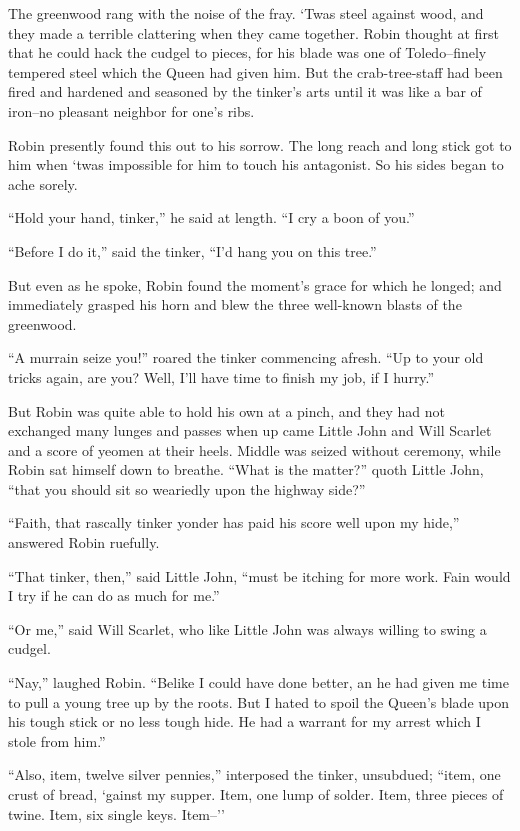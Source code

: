 The greenwood rang with the noise of the fray. `Twas steel against wood,
and they made a terrible clattering when they came together. Robin
thought at first that he could hack the cudgel to pieces, for his blade
was one of Toledo--finely tempered steel which the Queen had given him.
But the crab-tree-staff had been fired and hardened and seasoned by the
tinker's arts until it was like a bar of iron--no pleasant neighbor for
one's ribs.

Robin presently found this out to his sorrow. The long reach and long
stick got to him when `twas impossible for him to touch his antagonist.
So his sides began to ache sorely.

``Hold your hand, tinker,'' he said at length. ``I cry a boon of you.''

``Before I do it,'' said the tinker, ``I'd hang you on this tree.''

But even as he spoke, Robin found the moment's grace for which he
longed; and immediately grasped his horn and blew the three well-known
blasts of the greenwood.

``A murrain seize you!'' roared the tinker commencing afresh. ``Up to
your old tricks again, are you? Well, I'll have time to finish my job,
if I hurry.''

But Robin was quite able to hold his own at a pinch, and they had not
exchanged many lunges and passes when up came Little John and Will
Scarlet and a score of yeomen at their heels. Middle was seized without
ceremony, while Robin sat himself down to breathe. ``What is the
matter?'' quoth Little John, ``that you should sit so weariedly upon the
highway side?''

``Faith, that rascally tinker yonder has paid his score well upon my
hide,'' answered Robin ruefully.

``That tinker, then,'' said Little John, ``must be itching for more
work. Fain would I try if he can do as much for me.''

``Or me,'' said Will Scarlet, who like Little John was always willing to
swing a cudgel.

``Nay,'' laughed Robin. ``Belike I could have done better, an he had
given me time to pull a young tree up by the roots. But I hated to spoil
the Queen's blade upon his tough stick or no less tough hide. He had a
warrant for my arrest which I stole from him.''

``Also, item, twelve silver pennies,'' interposed the tinker, unsubdued;
``item, one crust of bread, `gainst my supper. Item, one lump of solder.
Item, three pieces of twine. Item, six single keys. Item--''

